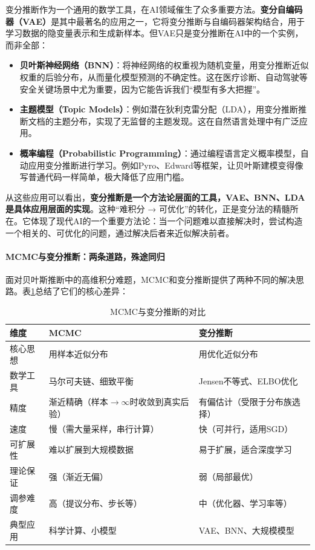 变分推断作为一个通用的数学工具，在AI领域催生了众多重要方法。\textbf{变分自编码器（VAE）}是其中最著名的应用之一，它将变分推断与自编码器架构结合，用于学习数据的隐变量表示和生成新样本。但VAE只是变分推断在AI中的一个实例，而非全部：
\begin{itemize}
\item \textbf{贝叶斯神经网络（BNN）}：将神经网络的权重视为随机变量，用变分推断近似权重的后验分布，从而量化模型预测的不确定性。这在医疗诊断、自动驾驶等安全关键场景中尤为重要，因为它能告诉我们``模型有多大把握''。

\item \textbf{主题模型（Topic Models）}：例如潜在狄利克雷分配（LDA），用变分推断推断文档的主题分布，实现了无监督的主题发现。这在自然语言处理中有广泛应用。

\item \textbf{概率编程（Probabilistic Programming）}：通过编程语言定义概率模型，自动应用变分推断进行学习。例如Pyro、Edward等框架，让贝叶斯建模变得像写普通代码一样简单，极大降低了应用门槛。
\end{itemize}

从这些应用可以看出，\textbf{变分推断是一个方法论层面的工具，VAE、BNN、LDA是具体应用层面的实现}。这种``难积分 → 可优化''的转化，正是变分法的精髓所在。它体现了现代AI的一个重要方法论：当一个问题难以直接解决时，尝试构造一个相关的、可优化的问题，通过解决后者来近似解决前者。

\paragraph{MCMC与变分推断：两条道路，殊途同归}

面对贝叶斯推断中的高维积分难题，MCMC和变分推断提供了两种不同的解决思路。表\ref{tab:mcmc_vi_comparison}总结了它们的核心差异：

\begin{table}[h]
\centering
\caption{MCMC与变分推断的对比}
\label{tab:mcmc_vi_comparison}
\begin{tabular}{l|l|l}
\hline
\textbf{维度} & \textbf{MCMC} & \textbf{变分推断} \\
\hline
核心思想 & 用样本近似分布 & 用优化近似分布 \\
数学工具 & 马尔可夫链、细致平衡 & Jensen不等式、ELBO优化 \\
精度 & 渐近精确（样本$\to\infty$时收敛到真实后验） & 有偏估计（受限于分布族选择） \\
速度 & 慢（需大量采样，串行计算） & 快（可并行，适用SGD） \\
可扩展性 & 难以扩展到大规模数据 & 易于扩展，适合深度学习 \\
理论保证 & 强（渐近无偏） & 弱（局部最优） \\
调参难度 & 高（提议分布、步长等） & 中（优化器、学习率等） \\
典型应用 & 科学计算、小模型 & VAE、BNN、大规模模型 \\
\hline
\end{tabular}
\end{table}


